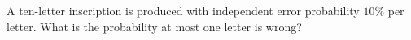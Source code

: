 A ten-letter inscription is produced with independent error probability $10\%$ per letter. What is the probability at most one letter is wrong?

